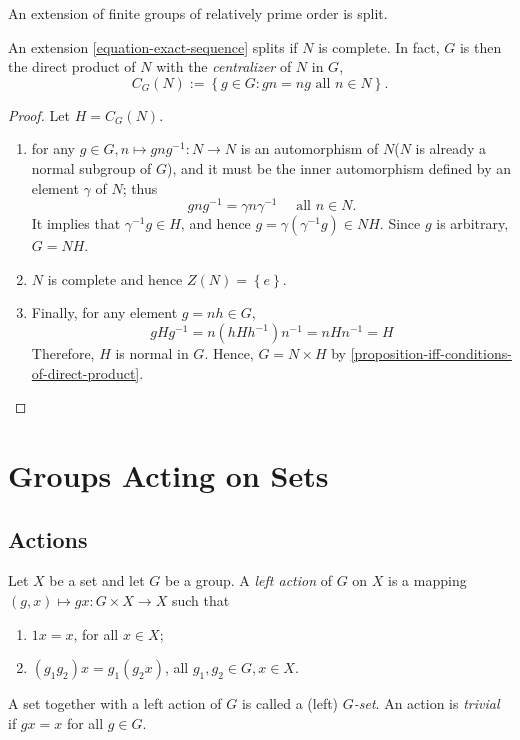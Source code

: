 \begin{theorem}
  \label{theorem-schur-zessenhaus}
  An extension of finite groups of relatively prime order is split.
\end{theorem}

\begin{proposition}
  \label{proposition-complete-implies-split}
  An extension \ref{equation-exact-sequence} splits if \( N \) is complete.
  In fact, \( G \) is then the direct product of \( N \) with the \emph{centralizer} of \( N \) in \( G \),
  \[
    C_G(N) := \left\lbrace g \in G: gn = ng \text{ all } n \in N \right\rbrace.
  \]
\end{proposition}
\begin{proof}
  Let \( H = C_G(N) \).
  \begin{enumerate}
    \item for any \( g \in G, n \mapsto g n g^{-1}: N \to N \) is an automorphism of \( N \)(\( N \) is already a normal subgroup of \( G \)), and it must be the inner automorphism defined by an element \( \gamma \) of \( N \);
      thus
      \[
        g n g^{-1} = \gamma n \gamma^{-1}\quad \text{ all } n \in N.
      \]
      It implies that \( \gamma^{-1}g \in H \), and hence \( g = \gamma(\gamma^{-1}g) \in N H \).
      Since \( g \) is arbitrary, \( G = NH \).
    \item \( N \) is complete and hence \( Z(N) = \left\lbrace e \right\rbrace \).
    \item Finally, for any element \( g = nh \in G \),
      \[
        g H g^{-1} = n(h H h^{-1})n^{-1} = nH n^{-1} = H
      \]
      Therefore, \( H \) is normal in \( G \).
      Hence, \( G = N \times H \) by \ref{proposition-iff-conditions-of-direct-product}.
  \end{enumerate}
\end{proof}

\section{Groups Acting on Sets}
\label{section-groups-acting-on-sets}

\subsection{Actions}
\label{subsection-actions}

\begin{definition}
  \label{definition-action}
  Let \( X \) be a set and let \( G \) be a group.
  A \emph{left action} of \( G \) on \( X \) is a mapping \( (g, x) \mapsto gx: G \times X \to X \) such that
  \begin{enumerate}
    \item \( 1x = x \), for all \( x \in X \);
    \item \( (g_1 g_2) x = g_1 (g_2x) \), all \( g_1, g_2 \in G, x \in X \).
  \end{enumerate}
  A set together with a left action of \( G \) is called a (left) \emph{\( G \)-set}.
  An action is \emph{trivial} if \( gx = x \) for all \( g \in G \).
\end{definition}

